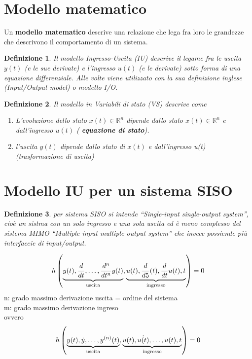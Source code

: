 \documentclass{book}
\newtheorem{defi}{Definizione}
\begin{document}
\section{Modello matematico}
Un \textbf{modello matematico} descrive una relazione che lega fra loro le grandezze che
descrivono il comportamento di un sistema.
\begin{defi}
  Il modello Ingresso-Uscita (IU) descrive il legame fra le uscita $y(t)$ (e le sue derivate) e
  l'ingresso $u(t)$ (e le derivate) sotto forma di una equazione differenziale. Alle volte viene
  utilizzato con la sua definizione inglese (Input/Output model) o modello I/O.
\end{defi}
\begin{defi}
  Il modello in Variabili di stato (VS) descrive come
  \begin{enumerate}
  \item L'evoluzione dello stato $x(t)\in \mathds{R}^n$ dipende dallo stato $x(t)\in \mathds{R}^n$ e dall'ingresso $u(t)$ ({\bf \color{red} equazione di stato}).
    \item l'uscita $y(t)$ dipende dallo stato di $x(t)$ e dall'ingresso u(t)
      (trasformazione di uscita)
    \end{enumerate}
  \end{defi}
  \section{Modello IU per un sistema SISO}
  \begin{defi}
    per sistema SISO si intende ``Single-input single-output system'', cioè un sistma con un solo
    ingresso e una sola uscita ed è meno complesso del sistema MIMO ``Multiple-input multiple-output system'' che invece possiende più interfaccie di input/output.
  \end{defi}
  
  \begin{equation*}
    h\left(\underbrace{y(t),\frac{d}{dt},\dots,\frac{d^n}{dt^n}y(t)}_{\text{\shortstack{uscita}}}, \underbrace{u(t),\frac{d}{d5}(t),\frac{d}{dt}u(t), t}_{\text{\shortstack{ingresso}}}\right)=0
  \end{equation*}
  n: grado massimo derivazione uscita = ordine del sistema\\
  m: grado massimo derivazione ingreso\\
  ovvero 
  \begin{equation*}
    h\left(\underbrace{y(t),\dot{y},\dots,y^{(n)}(t)}_{\text{\shortstack{uscita}}}, \underbrace{u(t),\dot{u(t)},\dots,u(t), t}_{\text{\shortstack{ingresso}}}\right)=0
  \end{equation*}

\printindex
\end{document}
